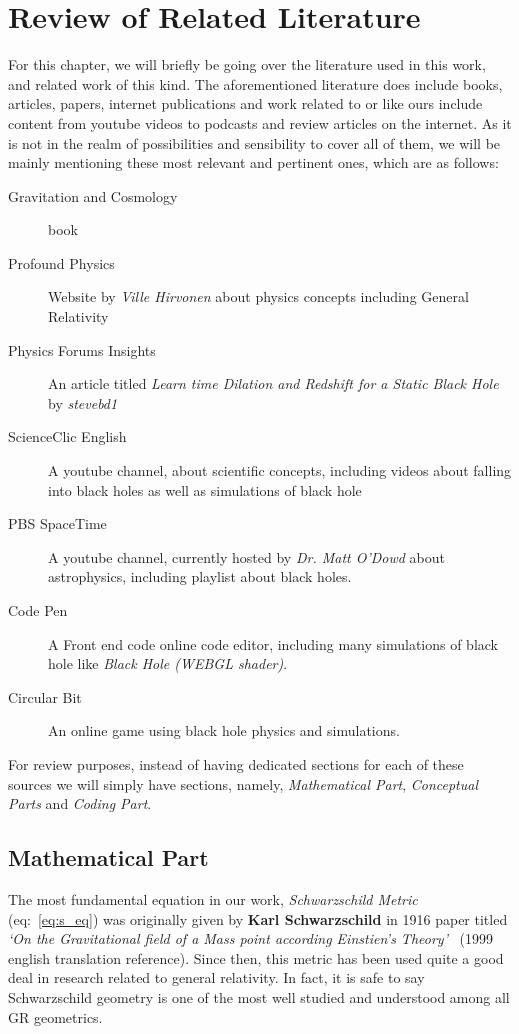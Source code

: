 \chapter{Review of Related Literature}\label{sec:review-of-related-literature}

For this chapter, we will briefly be going over the literature used in this work, and related work of this kind. The aforementioned literature does include books, 
articles, papers, internet publications and work related to or like ours include content from youtube videos to podcasts and review articles on the internet. As it 
is not in the realm of possibilities and sensibility to cover all of them, we will be mainly mentioning these most relevant and pertinent ones, which are as follows:

\begin{description}
    \item[Gravitation and Cosmology] book
    \item[Profound Physics] Website by \emph{Ville Hirvonen} about physics concepts including General Relativity
    \item[Physics Forums Insights] An article titled \emph{Learn time Dilation and Redshift for a Static Black Hole} by \emph{stevebd1}
    \item[ScienceClic English]  A youtube channel, about scientific concepts, including videos about falling into black holes as well as simulations of black hole
    \item[PBS SpaceTime] A youtube channel, currently hosted by \emph{Dr. Matt O'Dowd} about astrophysics, including playlist about black holes.
    \item[Code Pen] A Front end code online code editor, including many simulations of black hole like \emph{Black Hole (WEBGL shader)}.
    \item[Circular Bit] An online game using black hole physics and simulations.
\end{description}

For review purposes, instead of having dedicated sections for each of these sources we will simply have sections, namely, \emph{Mathematical Part}, \emph{Conceptual Parts} and \emph{Coding Part}.

\section{Mathematical Part}\label{sec:maths}

The most fundamental equation in our work, \emph{Schwarzschild Metric} (eq:~\ref{eq:s_eq}) was originally given by \textbf{Karl Schwarzschild} in 1916 paper 
titled \emph{`On the Gravitational field of a Mass point according Einstien's Theory'}~\cite{schwarzschild1999gravitationalfieldmasspoint} (1999 english translation reference). Since then, 
this metric has been used quite a good deal in research related to general relativity. In fact, it is safe to say Schwarzschild geometry is one of the most 
well studied and understood among all GR geometrics. 

